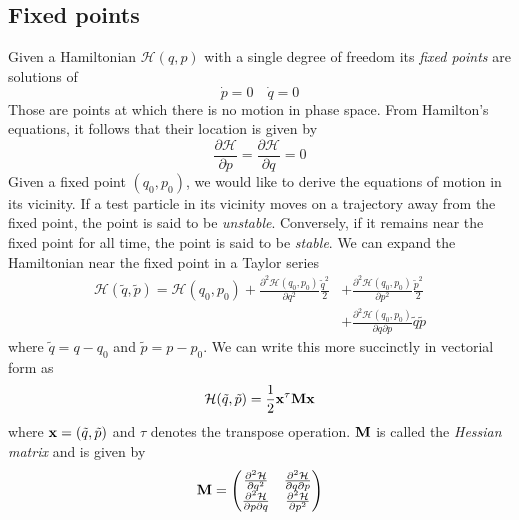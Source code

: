 \subsection{Fixed points}
Given a Hamiltonian $\mathcal{H}(q,p)$ with a single degree of freedom
its \emph{fixed points} are solutions of
\begin{equation}
    \dot{p}=0\quad\dot{q}=0
\end{equation}
Those are points at which there is no motion in phase space. From 
Hamilton's equations, it follows that their location is given by
\begin{equation}
   \frac{\partial \mathcal{H}}{\partial p}= \frac{\partial \mathcal{H}}{\partial q}=0
\end{equation}
Given a fixed point $(q_0,p_0)$, we would like to derive the equations
of motion in its vicinity. If a test particle in its vicinity moves 
on a trajectory away from the fixed point, the point is said to be
\emph{unstable}. Conversely, if it remains near the fixed point for all 
time, the point is said to be \emph{stable}. We can expand the Hamiltonian
near the fixed point in a Taylor series
\begin{align}
    \mathcal{H}(\tilde q, \tilde p)=\mathcal{H}(q_0,p_0) 
    + \frac{\partial^2\mathcal{H}(q_0,p_0)}{\partial q^2} \frac{\tilde q^2}{2} 
    &+\frac{\partial^2\mathcal{H}(q_0,p_0)}{\partial p^2} \frac{\tilde p^2}{2} \nonumber\\
    &+\frac{\partial^2\mathcal{H}(q_0,p_0)}{\partial q\partial p}\tilde q\tilde p 
\end{align}
where $\tilde q=q-q_0$ and $\tilde p=p-p_0$. We can write this more succinctly 
in vectorial form as
\begin{equation}
    \mathcal{H}(\tilde q,\tilde p)= \frac{1}{2} \boldsymbol{\mathbf{x}}^\tau\boldsymbol{\mathbf{M}}\boldsymbol{\mathbf{x}}
\end{equation}
where $\boldsymbol{\mathbf{x}}=(\tilde q, \tilde p)$ and $\tau$ denotes the transpose 
operation. $\boldsymbol{\mathbf{M}}$ is called the \emph{Hessian matrix} and is given by
\begin{equation}
    \boldsymbol{\mathbf{M}}=
    \begin{pmatrix}
        \frac{\partial^2 \mathcal{H}}{\partial q^2} &
        \frac{\partial^2 \mathcal{H}}{\partial q\partial p }\\
        \frac{\partial^2 \mathcal{H}}{\partial p \partial q} &
        \frac{\partial^2 \mathcal{H}}{\partial p^2} 
    \end{pmatrix}
    \label{eq:fixed_points_stability}
\end{equation}

